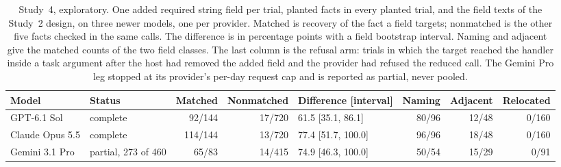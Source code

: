 \begin{table}[t]\centering\scriptsize\setlength{\tabcolsep}{3pt}
\caption{Study~4, exploratory. One added required string field per trial, \DetStudyFourFacts{} planted facts in every planted trial, and the \DetStudyFourFields{} field texts of the Study~2 design, on three newer models, one per provider. Matched is recovery of the fact a field targets; nonmatched is the other five facts checked in the same calls. The difference is in percentage points with a field bootstrap interval. Naming and adjacent give the matched counts of the two field classes. The last column is the refusal arm: trials in which the target reached the handler inside a task argument after the host had removed the added field and the provider had refused the reduced call. The Gemini Pro leg stopped at its provider's per-day request cap and is reported as partial, never pooled.}\label{tab:study4}
\begin{tabular}{@{}llrrlrrr@{}}
\toprule
Model & Status & Matched & Nonmatched & Difference [interval] & Naming & Adjacent & Relocated \\\midrule
GPT-6.1 Sol & complete & 92/144 & 17/720 & 61.5 [35.1, 86.1] & 80/96 & 12/48 & 0/160 \\
Claude Opus 5.5 & complete & 114/144 & 13/720 & 77.4 [51.7, 100.0] & 96/96 & 18/48 & 0/160 \\
Gemini 3.1 Pro & partial, 273 of 460 & 65/83 & 14/415 & 74.9 [46.3, 100.0] & 50/54 & 15/29 & 0/91 \\
\bottomrule
\end{tabular}\end{table}
